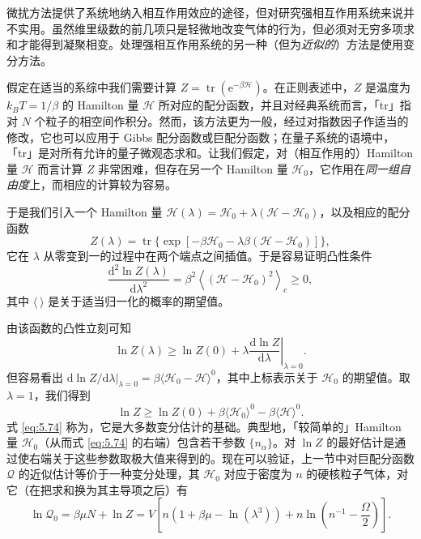 
微扰方法提供了系统地纳入相互作用效应的途径，但对研究强相互作用系统来说并不实用。虽然维里级数的前几项只是轻微地改变气体的行为，但必须对无穷多项求和才能得到凝聚相变。处理强相互作用系统的另一种（但为\emph{近似的}）方法是使用变分方法。

假定在适当的系综中我们需要计算 $Z=\operatorname{tr}\left(\mathrm{e}^{-\beta\mathscr H}\right)$。在正则表述中，$Z$ 是温度为 $k_BT=1/\beta$ 的 Hamilton 量 $\mathscr H$ 所对应的配分函数，并且对经典系统而言，「tr」指对 $N$ 个粒子的相空间作积分。然而，该方法更为一般，经过对指数因子作适当的修改，它也可以应用于 Gibbs 配分函数或巨配分函数；在量子系统的语境中，「tr」是对所有允许的量子微观态求和。让我们假定，对（相互作用的）Hamilton 量 $\mathscr H$ 而言计算 $Z$ 非常困难，但存在另一个 Hamilton 量 $\mathscr H_0$，它作用在\emph{同一组自由度}上，而相应的计算较为容易。


于是我们引入一个 Hamilton 量 $\mathscr H(\lambda)=\mathscr H_0+\lambda(\mathscr H-\mathscr H_0)$，以及相应的配分函数
\begin{equation}\label{eq:5.71}
Z(\lambda)=\operatorname{tr}\{\exp[-\beta\mathscr H_0-\lambda\beta(\mathscr H-\mathscr H_0)]\},
\end{equation}
它在 $\lambda$ 从零变到一的过程中在两个端点之间插值。于是容易证明凸性条件
\begin{equation}\label{eq:5.72}
\frac{\mathrm{d}^2\ln Z(\lambda)}{\mathrm{d}\lambda^2}=\beta^2\left\langle(\mathscr H-\mathscr H_0)^2\right\rangle_c\ge0,
\end{equation}
其中 $\langle\ \rangle$ 是关于适当归一化的概率的期望值。


由该函数的凸性立刻可知
\begin{equation}\label{eq:5.73}
\ln Z(\lambda)\ge\ln Z(0)+\lambda\left.\frac{\mathrm{d}\ln Z}{\mathrm{d}\lambda}\right|_{\lambda=0}.
\end{equation}
但容易看出 $\mathrm{d}\ln Z/\mathrm{d}\lambda|_{\lambda=0}=\beta\langle\mathscr H_0-\mathscr H\rangle^0$，其中上标表示关于 $\mathscr H_0$ 的期望值。取 $\lambda=1$，我们得到
\begin{equation}\label{eq:5.74}
\ln Z\ge\ln Z(0)+\beta\langle\mathscr H_0\rangle^0-\beta\langle\mathscr H\rangle^0.
\end{equation}
式 \eqref{eq:5.74} 称为，它是大多数变分估计的基础。典型地，「较简单的」Hamilton 量 $\mathscr H_0$（从而式 \eqref{eq:5.74} 的右端）包含若干参数 $\{n_\alpha\}$。对 $\ln Z$ 的最好估计是通过使右端关于这些参数取极大值来得到的。现在可以验证，上一节中对巨配分函数 $\mathcal{Q}$ 的近似估计等价于一种变分处理，其 $\mathscr H_0$ 对应于密度为 $n$ 的硬核粒子气体，对它（在把求和换为其主导项之后）有
\begin{equation}\label{eq:5.75}
\ln\mathcal{Q}_0=\beta\mu N+\ln Z=V\left[n(1+\beta\mu-\ln(\lambda^3))+n\ln\left(n^{-1}-\frac{\Omega}{2}\right)\right].
\end{equation}

